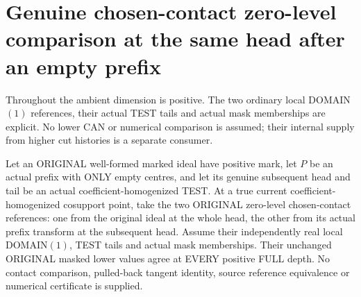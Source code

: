 \section{Genuine chosen-contact zero-level comparison at the same head after an empty prefix}

Throughout the ambient dimension is positive. The two ordinary local
DOMAIN$(1)$ references, their actual TEST tails and actual mask memberships
are explicit. No lower CAN or numerical comparison is assumed; their
internal supply from higher cut histories is a separate consumer.

\begin{theorem}
\label{hir:original-zero-empty-prefix-same-head-lower-values}
\leanok
Let an ORIGINAL well-formed marked ideal have positive mark, let $P$ be
an actual prefix with ONLY empty centres, and let its genuine subsequent
head and tail be an actual coefficient-homogenized TEST. At a true current
coefficient-homogenized cosupport point, take the two ORIGINAL zero-level
chosen-contact references: one from the original ideal at the whole head,
the other from its actual prefix transform at the subsequent head. Assume
their independently real local DOMAIN$(1)$, TEST tails and actual mask
memberships. Their unchanged ORIGINAL masked lower values agree at EVERY
positive FULL depth. No contact comparison, pulled-back tangent identity,
source reference equivalence or numerical certificate is supplied.
\end{theorem}
